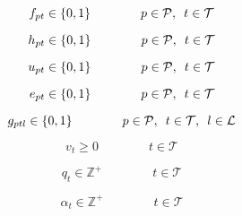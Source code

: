 \begin{equation} \label{eq:bin_f}
    f_{pt} \in \{0,1\} \qquad\qquad p \in \mathcal{P}, \enskip t \in \mathcal{T}
\end{equation}

\begin{equation} \label{eq:bin_h}
    h_{pt} \in \{0,1\} \qquad\qquad p \in \mathcal{P}, \enskip t \in \mathcal{T}
\end{equation}
 
\begin{equation} \label{eq:bin_u}
    u_{pt} \in \{0,1\} \qquad\qquad p \in \mathcal{P}, \enskip t \in \mathcal{T} 
\end{equation}

\begin{equation} \label{eq:nonn_e}
    e_{pt} \in \{0,1\} \qquad\qquad p \in \mathcal{P}, \enskip t \in \mathcal{T} 
\end{equation}

\begin{equation} \label{eq:binf_g}
    g_{ptl} \in \{0,1\} \qquad\qquad p \in \mathcal{P}, \enskip t \in \mathcal{T},\enskip l \in \mathcal{L}
\end{equation}

\begin{equation} \label{eq:nonn_v}
    v_{t} \geq 0 \qquad\qquad t \in \mathcal{T} 
\end{equation}

\begin{equation} \label{eq:int_q}
    q_{t} \in \mathbb{Z}^{+}  \qquad\qquad t \in \mathcal{T}
\end{equation}

\begin{equation} \label{eq:int_alpha}
    \alpha_{t} \in \mathbb{Z}^{+}  \qquad\qquad t \in \mathcal{T}
\end{equation}

